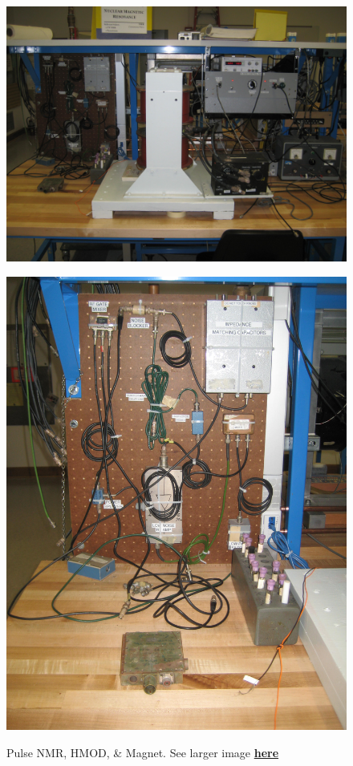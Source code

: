 \documentclass{../lab}
\begin{document}
\begin{figure}[h]
\begin{minipage}{0.36\textwidth}
\end{minipage}
\begin{minipage}{0.36\textwidth}
    \href{http://experimentationlab.berkeley.edu/sites/default/files/images/PNMR_3494.jpg}{\includegraphics[width=\linewidth,keepaspectratio]{images/PNMR_3494.jpg}}
    \caption{Pulse NMR, HMOD, \& Magnet. See larger image \href{http://experimentationlab.berkeley.edu/sites/default/files/images/PNMR_3494.jpg}{\textbf{here}}}
\end{minipage}
\begin{minipage}{0.20\textwidth}
    \href{http://experimentationlab.berkeley.edu/sites/default/files/images/PNMR_3495.jpg}{\includegraphics[width=\linewidth,keepaspectratio]{images/PNMR_3495.jpg}}

\end{minipage}
\end{figure}
\end{document}
